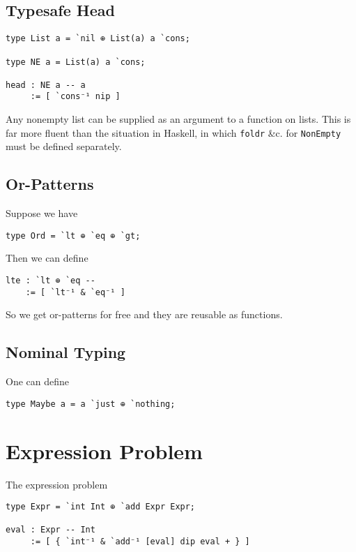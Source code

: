 \documentclass{article}
\begin{document}
\subsection{Typesafe Head}

\begin{verbatim}
type List a = `nil ⊕ List(a) a `cons;

type NE a = List(a) a `cons;

head : NE a -- a
     := [ `cons⁻¹ nip ]
\end{verbatim}

Any nonempty list can be supplied as an argument to a function on lists. This is far more fluent than the situation in Haskell, in which \verb|foldr| \&c. for \verb|NonEmpty| must be defined separately.

\subsection{Or-Patterns}

Suppose we have

\begin{verbatim}
type Ord = `lt ⊕ `eq ⊕ `gt;
\end{verbatim}

Then we can define

\begin{verbatim}
lte : `lt ⊕ `eq --
    := [ `lt⁻¹ & `eq⁻¹ ]
\end{verbatim}

So we get or-patterns for free and they are reusable as functions.

\subsection{Nominal Typing}

One can define

\begin{verbatim}
type Maybe a = a `just ⊕ `nothing;
\end{verbatim}

\section{Expression Problem}

The expression problem

\begin{verbatim}
type Expr = `int Int ⊕ `add Expr Expr;

eval : Expr -- Int
     := [ { `int⁻¹ & `add⁻¹ [eval] dip eval + } ]
\end{verbatim}
\end{document}

